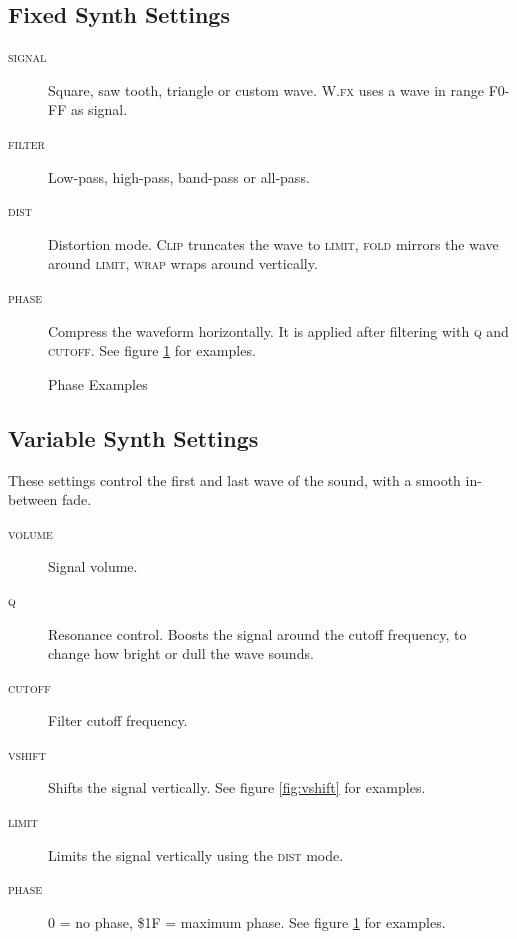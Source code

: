 \subsection{Fixed Synth Settings}

\begin{description}
	\item[\textsc{signal}] Square, saw tooth, triangle or custom wave. \textsc{W.fx} uses a wave in range F0-FF as signal.
\item[\textsc{filter}] Low-pass, high-pass, band-pass or all-pass.
\item[\textsc{dist}] Distortion mode. \textsc{Clip} truncates the wave to \textsc{limit}, \textsc{fold} mirrors the wave around \textsc{limit}, \textsc{wrap} wraps around vertically.
\item[\textsc{phase}] \label{phase}
Compress the waveform horizontally. It is applied after filtering with \textsc{q} and \textsc{cutoff}. See figure \ref{fig:phasing} for examples.
\end{description}

\begin{figure}[hbtp]
	\centering
	\qquad

	\qquad
	\caption{Phase Examples}
	\label{fig:phasing}
\end{figure}

\subsection{Variable Synth Settings}

These settings control the first and last wave of the sound, with a smooth in-between fade.

\begin{description}
\item[\textsc{volume}] Signal volume.
\item[\textsc{q}] Resonance control. Boosts the signal around the cutoff frequency, to change how bright or dull the wave sounds.
\item[\textsc{cutoff}] Filter cutoff frequency.
\item[\textsc{vshift}] Shifts the signal vertically. See figure \ref{fig:vshift} for examples.
\item[\textsc{limit}] Limits the signal vertically using the \textsc{dist} mode.
\item[\textsc{phase}] 0 = no phase, \$1F = maximum phase. See figure \ref{fig:phasing} for examples.
\end{description}

